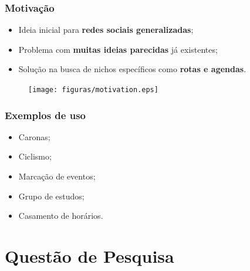 \documentclass{beamer}
\begin{document}
\begin{frame}
\frametitle{Motivação}

\begin{itemize}
	\item Ideia inicial para \textbf{redes sociais generalizadas};
	\item Problema com \textbf{muitas ideias parecidas} já existentes;
	\item Solução na busca de nichos específicos como \textbf{rotas e agendas}.
\end{itemize}

\begin{figure}[h]
	\centering
	\texttt{[image: figuras/motivation.eps]}
\end{figure}

\end{frame}

\begin{frame}
\frametitle{Exemplos de uso}

\begin{itemize}
	\item Caronas;
	\item Ciclismo;
	\item Marcação de eventos;
	\item Grupo de estudos;
	\item Casamento de horários.
\end{itemize}

\end{frame}

\section{Questão de Pesquisa}
\end{document}
